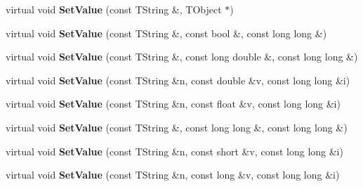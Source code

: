 \begin{DoxyCompactItemize}
\item 
\hypertarget{class_h_a_l_1_1_analysis_data_ac30be252a2ee9afe72db28b4cc2160da}{virtual void {\bfseries Set\-Value} (const T\-String \&, T\-Object $\ast$)}\label{class_h_a_l_1_1_analysis_data_ac30be252a2ee9afe72db28b4cc2160da}

\item 
\hypertarget{class_h_a_l_1_1_analysis_data_a12ad774235747ddc93efe315b22bf9e6}{virtual void {\bfseries Set\-Value} (const T\-String \&, const bool \&, const long long \&)}\label{class_h_a_l_1_1_analysis_data_a12ad774235747ddc93efe315b22bf9e6}

\item 
\hypertarget{class_h_a_l_1_1_analysis_data_a2628f2b892533b16f0a991bee3e0054b}{virtual void {\bfseries Set\-Value} (const T\-String \&, const long double \&, const long long \&)}\label{class_h_a_l_1_1_analysis_data_a2628f2b892533b16f0a991bee3e0054b}

\item 
\hypertarget{class_h_a_l_1_1_analysis_data_a59a7de41ba6832fb70f97b4c1e275fd3}{virtual void {\bfseries Set\-Value} (const T\-String \&n, const double \&v, const long long \&i)}\label{class_h_a_l_1_1_analysis_data_a59a7de41ba6832fb70f97b4c1e275fd3}

\item 
\hypertarget{class_h_a_l_1_1_analysis_data_a69059a19ae4a37a01eedfa98c537c487}{virtual void {\bfseries Set\-Value} (const T\-String \&n, const float \&v, const long long \&i)}\label{class_h_a_l_1_1_analysis_data_a69059a19ae4a37a01eedfa98c537c487}

\item 
\hypertarget{class_h_a_l_1_1_analysis_data_aad5a01dc8b2510bdcb47854a3cdaba0d}{virtual void {\bfseries Set\-Value} (const T\-String \&, const long long \&, const long long \&)}\label{class_h_a_l_1_1_analysis_data_aad5a01dc8b2510bdcb47854a3cdaba0d}

\item 
\hypertarget{class_h_a_l_1_1_analysis_data_adfb861d9e83e6880e54d11447b7047be}{virtual void {\bfseries Set\-Value} (const T\-String \&n, const short \&v, const long long \&i)}\label{class_h_a_l_1_1_analysis_data_adfb861d9e83e6880e54d11447b7047be}

\item 
\hypertarget{class_h_a_l_1_1_analysis_data_ac01b1d8a623777b81d5969d2b553a003}{virtual void {\bfseries Set\-Value} (const T\-String \&n, const long \&v, const long long \&i)}\label{class_h_a_l_1_1_analysis_data_ac01b1d8a623777b81d5969d2b553a003}


\end{DoxyCompactItemize}
